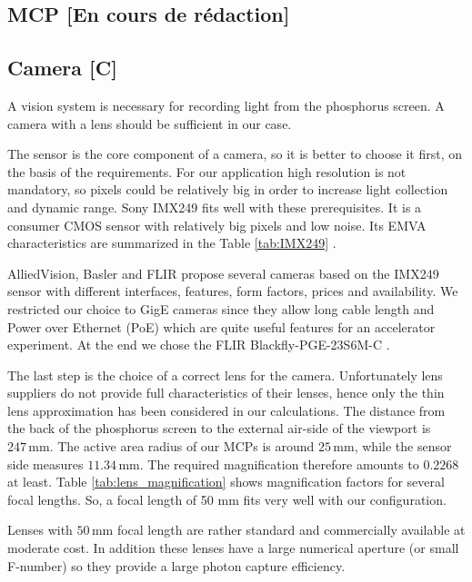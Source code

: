\begin{refsection}
  \subsection{MCP [En cours de rédaction]}
  
  \subsection{Camera [C]}
  A vision system is necessary for recording light from the phosphorus screen.
  A camera with a lens should be sufficient in our case.

  The sensor is the core component of a camera, so it is better to choose it first, on the basis of the requirements.
  For our application high resolution is not mandatory, so pixels could be relatively big in order to increase light collection and dynamic range.
  Sony IMX249 fits well with these prerequisites. It is a consumer CMOS sensor with relatively big pixels and low noise.
  Its EMVA characteristics are summarized in the Table \ref{tab:IMX249} \cite{emva2010}.
  

  AlliedVision, Basler and FLIR propose several cameras based on the IMX249 sensor with different interfaces, features, form factors, prices and availability.
  We restricted our choice to GigE cameras since they allow long cable length and Power over Ethernet (PoE) which are quite useful features for an accelerator experiment.
  At the end we chose the FLIR Blackfly-PGE-23S6M-C \cite{blackfly2019}.

  The last step is the choice of a correct lens for the camera.
  Unfortunately lens suppliers do not provide full characteristics of their lenses, hence only the thin lens approximation has been considered in our calculations. The distance from the back of the phosphorus screen to the external air-side of the viewport is $247\,\mathrm{mm}$. The active area radius of our MCPs is around $25\,\mathrm{mm}$, while the sensor side measures $11.34\,\mathrm{mm}$. The required magnification therefore amounts to $0.2268$ at least.
  Table \ref{tab:lens_magnification} shows magnification factors for several focal lengths. So, a focal length of 50 mm fits very well with our configuration.
  

  Lenses with $50\,\mathrm{mm}$ focal length are rather standard and commercially available at moderate cost. In addition these lenses have a large numerical aperture (or small F-number) so they provide a large photon capture efficiency.


\end{refsection}
